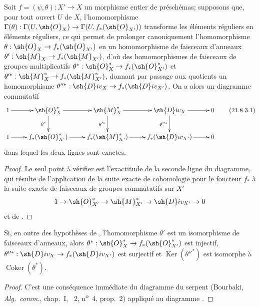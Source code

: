 \begin{proposition}[21.8.3]
\label{IV.21.8.3}
Soit $f=(\psi,\theta):X'\to X$ un morphisme entier de préschémas;
supposons que, pour tout ouvert $U$ de $X$, l'homomorphisme $\Gamma(\theta):\Gamma(U,\sh{O}_X)\to\Gamma(U,f_*(\sh{O}_{X'}))$ transforme les éléments réguliers en éléments réguliers, ce qui permet de prolonger canoniquement l'homomorphisme $\theta:\sh{O}_X\to f_*(\sh{O}_{X'})$ en un homomorphisme de faisceaux d'anneaux $\theta':\sh{M}_X\to f_*(\sh{M}_{X'})$, d'où des homomorphismes de faisceaux de groupes multiplicatifs $\theta^*:\sh{O}^*_X\to f_*(\sh{O}^*_{X'})$ et $\theta'^*:\sh{M}^*_X\to f_*(\sh{M}^*_{X'})$, donnant par passage aux quotients un homomorphisme $\theta''^*:\sh{D}iv_X\to f_*(\sh{D}iv_{X'})$.
On a alors un diagramme commutatif
\[
\label{IV.21.8.3.1}
  \xymatrix{
    1 \ar[r] & \sh{O}^*_X \ar[r] \ar[d]_{\theta^*} & \sh{M}^*_X \ar[r] \ar[d]_{\theta'^*} & \sh{D}iv_X \ar[r] \ar[d]_{\theta''^*} & 0\\
    1 \ar[r] & f_*(\sh{O}^*_{X'}) \ar[r] & f_*(\sh{M}^*_{X'}) \ar[r] & f_*(\sh{D}iv_{X'}) \ar[r] & 0
  }
  \tag{21.8.3.1}
\]
dans lequel les deux lignes sont exactes.
\end{proposition}

\begin{proof}
Le seul point à vérifier est l'exactitude de la seconde ligne du diagramme, qui résulte de l'application de la suite exacte de cohomologie pour le foncteur $f_*$ à la suite exacte de faisceaux de groupes commutatifs sur $X'$
\[
  1\to\sh{O}^*_{X'}\to\sh{M}^*_{X'}\to\sh{D}iv_{X'}\to0
\]
et de .
\end{proof}


\begin{corollary}[21.8.4]
\label{IV.21.8.4}
Si, en outre des hypothèses de , l'homomorphisme $\theta'$ est un isomorphisme de faisceaux d'anneaux, alors $\theta^*:\sh{O}^*_X\to f_*(\sh{O}^*_{X'})$ est injectif, $\theta''^*:\sh{D}iv_X\to f_*(\sh{D}iv_{X'})$ est surjectif et $\operatorname{Ker}(\theta''^*)$ est isomorphe à $\operatorname{Coker}(\theta^*)$.
\end{corollary}

\begin{proof}
C'est une conséquence immédiate du diagramme du serpent (Bourbaki, \emph{Alg.\ comm.}, chap.~I, \textsection~2, n\textsuperscript{o}~4, prop.~2) appliqué au diagramme .
\end{proof}

